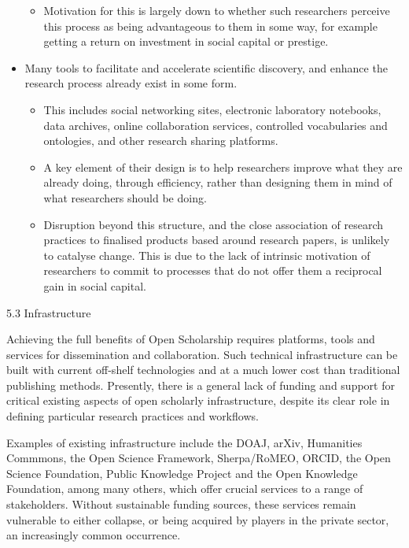\documentclass[]{article}
\providecommand{\tightlist}{%
  \setlength{\itemsep}{0pt}\setlength{\parskip}{0pt}}
\begin{document}
\begin{itemize}
  \begin{itemize}
  \tightlist
  \item
    Motivation for this is largely down to whether such researchers
    perceive this process as being advantageous to them in some way, for
    example getting a return on investment in social capital or
    prestige.
  \end{itemize}
\item
  Many tools to facilitate and accelerate scientific discovery, and
  enhance the research process already exist in some form.

  \begin{itemize}
  \item
    This includes social networking sites, electronic laboratory
    notebooks, data archives, online collaboration services, controlled
    vocabularies and ontologies, and other research sharing platforms.
  \item
    A key element of their design is to help researchers improve what
    they are already doing, through efficiency, rather than designing
    them in mind of what researchers should be doing.
  \item
    Disruption beyond this structure, and the close association of
    research practices to finalised products based around research
    papers, is unlikely to catalyse change. This is due to the lack of
    intrinsic motivation of researchers to commit to processes that do
    not offer them a reciprocal gain in social capital.
  \end{itemize}
\end{itemize}

5.3 Infrastructure

Achieving the full benefits of Open Scholarship requires platforms,
tools and services for dissemination and collaboration. Such technical
infrastructure can be built with current off-shelf technologies and at a
much lower cost than traditional publishing methods. Presently, there is
a general lack of funding and support for critical existing aspects of
open scholarly infrastructure, despite its clear role in defining
particular research practices and workflows.

Examples of existing infrastructure include the DOAJ, arXiv, Humanities
Commmons, the Open Science Framework, Sherpa/RoMEO, ORCID, the Open
Science Foundation, Public Knowledge Project and the Open Knowledge
Foundation, among many others, which offer crucial services to a range
of stakeholders. Without sustainable funding sources, these services
remain vulnerable to either collapse, or being acquired by players in
the private sector, an increasingly common occurrence.
\end{document}

